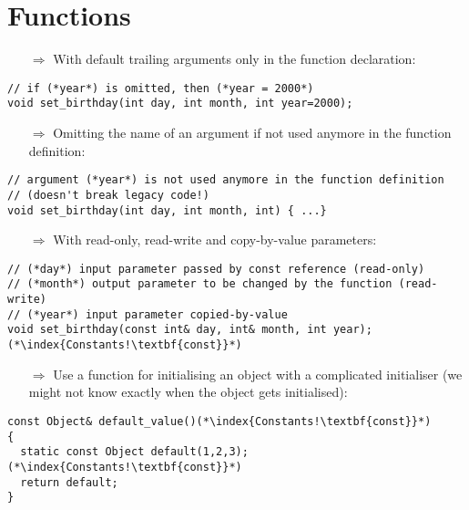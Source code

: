 \documentclass[10pt]{article}
\begin{document}
\section{Functions}
\small
\begin{enumerate}
\item[$\Rightarrow$] With default trailing arguments only in the function declaration:
\end{enumerate}
\begin{lstlisting}
// if (*year*) is omitted, then (*year = 2000*)
void set_birthday(int day, int month, int year=2000);
\end{lstlisting}
\begin{enumerate}
\item[$\Rightarrow$] Omitting the name of an argument if not used anymore in the function definition:
\end{enumerate}
\begin{lstlisting}
// argument (*year*) is not used anymore in the function definition
// (doesn't break legacy code!)
void set_birthday(int day, int month, int) { ...}
\end{lstlisting}
\begin{enumerate}
\item[$\Rightarrow$] With read-only, read-write and copy-by-value parameters:
\end{enumerate}
\begin{lstlisting}
// (*day*) input parameter passed by const reference (read-only)
// (*month*) output parameter to be changed by the function (read-write)
// (*year*) input parameter copied-by-value
void set_birthday(const int& day, int& month, int year);(*\index{Constants!\textbf{const}}*)
\end{lstlisting}
\begin{enumerate}
\item[$\Rightarrow$] Use a function for initialising an object with a complicated initialiser (we might not
know exactly when the object gets initialised):
\end{enumerate}
\begin{lstlisting}
const Object& default_value()(*\index{Constants!\textbf{const}}*)
{
  static const Object default(1,2,3);(*\index{Constants!\textbf{const}}*)
  return default;
}
\end{lstlisting}
\end{document}
